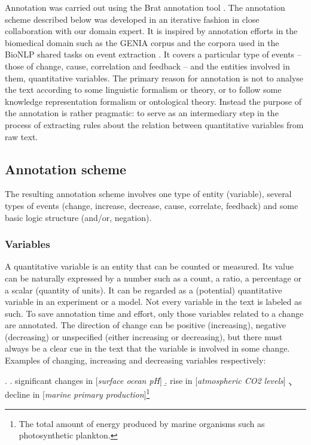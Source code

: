 \documentclass[10pt, a4paper]{article}
\begin{document}
Annotation was carried out using the Brat annotation tool \cite{stenetorp2012}.
The annotation scheme described below was developed in an iterative fashion in close collaboration with our domain expert.
It is inspired by annotation efforts in the biomedical domain such as the GENIA corpus \cite{Kim2003GENIA} and the corpora used in the BioNLP shared tasks on event extraction \cite{Kim2009Overview}.
It covers a particular type of events -- those of change, cause, correlation and feedback -- and the entities involved in them, quantitative variables.
The primary reason for annotation is not to analyse the text according to some linguistic formalism or theory, or to follow some knowledge representation formalism or ontological theory.
Instead the purpose of the annotation is rather pragmatic: to serve as an intermediary step in the process of extracting rules about the relation between quantitative variables from raw text.      
 
\subsection{Annotation scheme}

The resulting annotation scheme involves one type of entity (variable), several types of events (change, increase, decrease, cause, correlate, feedback) and some basic logic structure (and/or, negation).  


\subsubsection{Variables}

A quantitative variable is an entity that can be counted or measured.
Its value can be naturally expressed by a number such as a count, a ratio, a percentage or a scalar (quantity of units).
It can be regarded as a (potential) quantitative variable in an experiment or a model. 
Not every variable in the text is labeled as such.
To save annotation time and effort, only those variables related to a change are annotated.
The  direction of change can be positive (increasing), negative (decreasing) or unspecified (either increasing or decreasing), but there must always be a clear cue in the text that the variable is involved in some change. 
Examples of changing, increasing and decreasing variables respectively:

\ex.
  \a. significant changes in [\emph{surface ocean pH}]
  \b. rise in [\emph{atmospheric CO2 levels}]
  \c. decline in [\emph{marine primary production}]\footnote{The total amount of energy produced by marine organisms such as photosynthetic plankton.}
\end{document}
